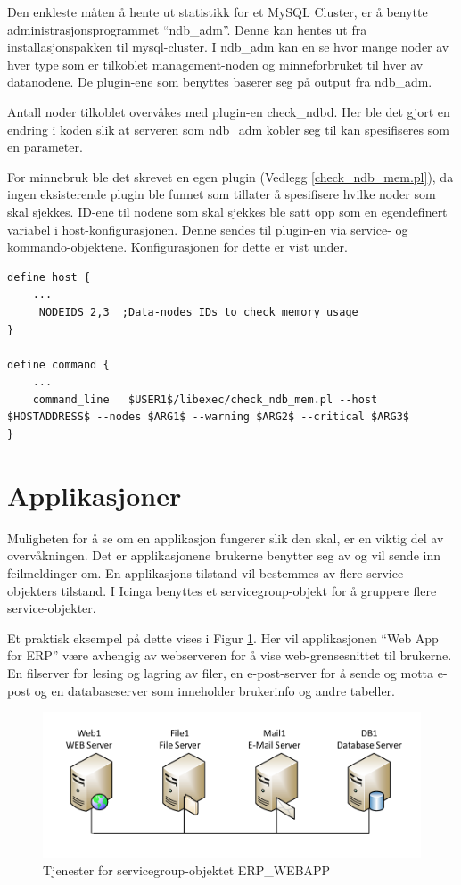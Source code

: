 Den enkleste måten å hente ut statistikk for et MySQL Cluster, er å benytte administrasjonsprogrammet ``ndb\_adm''. Denne kan hentes ut fra installasjonspakken til mysql-cluster\cite{ndbdownload}. I ndb\_adm kan en se hvor mange noder av hver type som er tilkoblet management-noden og minneforbruket til hver av datanodene. De plugin-ene som benyttes baserer seg på output fra ndb\_adm.

Antall noder tilkoblet overvåkes med plugin-en check\_ndbd\cite{ndbnode}. Her ble det gjort en endring i koden slik at serveren som ndb\_adm kobler seg til kan spesifiseres som en parameter.

For minnebruk ble det skrevet en egen plugin (Vedlegg \ref{check_ndb_mem.pl}), da ingen eksisterende plugin ble funnet som tillater å spesifisere hvilke noder som skal sjekkes. ID-ene til nodene som skal sjekkes ble satt opp som en egendefinert variabel i host-konfigurasjonen. Denne sendes til plugin-en via service- og kommando-objektene. Konfigurasjonen for dette er vist under.
\begin{lstlisting}[style=example]
define host {
	...
	_NODEIDS 2,3  ;Data-nodes IDs to check memory usage
}

define command {
	...
	command_line   $USER1$/libexec/check_ndb_mem.pl --host $HOSTADDRESS$ --nodes $ARG1$ --warning $ARG2$ --critical $ARG3$
}
\end{lstlisting}

\section{Applikasjoner}
Muligheten for å se om en applikasjon fungerer slik den skal, er en viktig del av overvåkningen. Det er applikasjonene brukerne benytter seg av og vil sende inn feilmeldinger om. En applikasjons tilstand vil bestemmes av flere service-objekters tilstand. I Icinga benyttes et servicegroup-objekt for å gruppere flere service-objekter.

Et praktisk eksempel på dette vises i Figur \ref{servicegroup_layout}. Her vil applikasjonen ``Web App for ERP'' være avhengig av webserveren for å vise web-grensesnittet til brukerne. En filserver for lesing og lagring av filer, en e-post-server for å sende og motta e-post og en databaseserver som inneholder brukerinfo og andre tabeller. 

\begin{figure}[H]
    \centering
    \includegraphics[scale=0.6]{img/servicegroup_layout}
    \caption{Tjenester for servicegroup-objektet ERP\_WEBAPP}
    \label{servicegroup_layout}
\end{figure}

